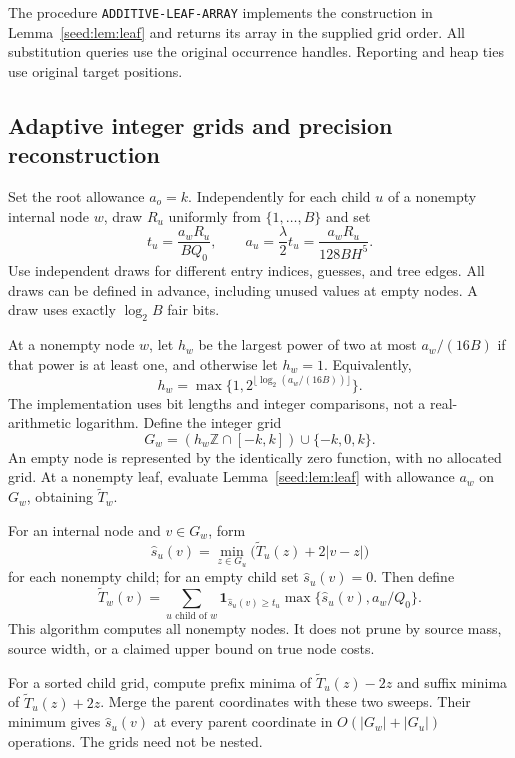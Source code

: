 \documentclass[11pt]{article}
\theoremstyle{definition}
\newcommand{\1}{\mathbf 1}
\begin{document}
The procedure \texttt{ADDITIVE-LEAF-ARRAY} implements the construction
in Lemma~\ref{seed:lem:leaf} and returns its array in the supplied grid
order. All substitution queries use the original occurrence handles.
Reporting and heap ties use original target positions.

\subsection{Adaptive integer grids and precision reconstruction}

Set the root allowance $a_o=k$. Independently for each child $u$ of a
nonempty internal node $w$, draw $R_u$ uniformly from $\{1,\dots,B\}$ and set
\[
 t_u=\frac{a_wR_u}{BQ_0},\qquad
 a_u=\frac{\lambda}{2}t_u
     =\frac{a_wR_u}{128BH^5}.
\]
Use independent draws for different entry indices, guesses, and tree
edges. All draws can be defined in advance, including unused values at
empty nodes. A draw uses exactly $\log_2B$ fair bits.

At a nonempty node $w$, let $h_w$ be the largest power of two at most
$a_w/(16B)$ if that power is at least one, and otherwise let $h_w=1$.
Equivalently,
\[
 h_w=\max\{1,2^{\lfloor\log_2(a_w/(16B))\rfloor}\}.
\]
The implementation uses bit lengths and integer comparisons, not a
real-arithmetic logarithm. Define the integer grid
\[
 G_w=(h_w\mathbb Z\cap[-k,k])\cup\{-k,0,k\}.
\]
An empty node is represented by the identically zero function, with no
allocated grid. At a nonempty leaf, evaluate Lemma~\ref{seed:lem:leaf} with
allowance $a_w$ on $G_w$, obtaining $\widetilde T_w$.

For an internal node and $v\in G_w$, form
\[
 \widehat s_u(v)=\min_{z\in G_u}
          \bigl(\widetilde T_u(z)+2|v-z|\bigr)
\]
for each nonempty child; for an empty child set $\widehat s_u(v)=0$.
Then define
\[
 \widetilde T_w(v)=\sum_{u\text{ child of }w}
   \1_{\widehat s_u(v)\ge t_u}
   \max\{\widehat s_u(v),a_w/Q_0\}.
\]
This algorithm computes all nonempty nodes. It does not prune by source
mass, source width, or a claimed upper bound on true node costs.

For a sorted child grid, compute prefix minima of
$\widetilde T_u(z)-2z$ and suffix minima of $\widetilde T_u(z)+2z$.
Merge the parent coordinates with these two sweeps. Their minimum gives
$\widehat s_u(v)$ at every parent coordinate in
$O(|G_w|+|G_u|)$ operations. The grids need not be nested.
\end{document}
